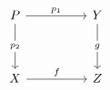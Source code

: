 \documentclass[aspectratio=169]{beamer}
\begin{document}
\begin{frame}
\[\begin{tikzcd}[ampersand replacement=\&]
	P \&\& Y \\
	\\
	X \&\& Z
	\arrow["{p_1}", from=1-1, to=1-3]
	\arrow["{p_2}"{description}, from=1-1, to=3-1]
	\arrow["g"{description}, from=1-3, to=3-3]
	\arrow["f", from=3-1, to=3-3]
\end{tikzcd}\]

\end{frame}
\end{document}
